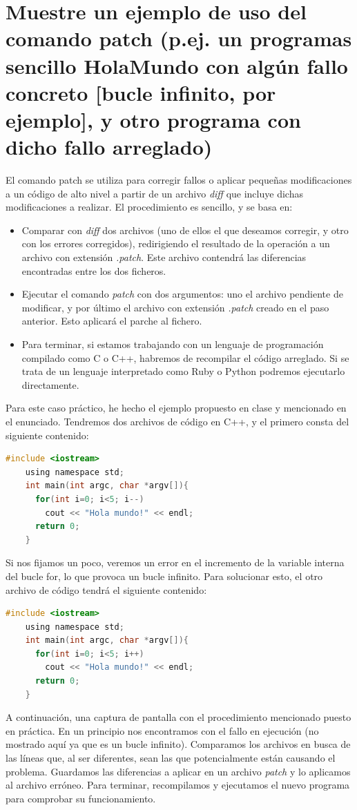 \section{Muestre un ejemplo de uso del comando patch (p.ej. un programas sencillo HolaMundo con algún fallo concreto [bucle infinito, por ejemplo], y otro programa con dicho fallo arreglado)}
El comando patch se utiliza para corregir fallos o aplicar pequeñas modificaciones a un código de alto nivel a partir de un archivo \emph{diff} que incluye dichas modificaciones a realizar. El procedimiento es sencillo, y se basa en:
\begin{itemize}
	\item Comparar con \emph{diff} dos archivos (uno de ellos el que deseamos corregir, y otro con los errores corregidos), redirigiendo el resultado de la operación a un archivo con extensión \emph{.patch}. Este archivo contendrá las diferencias encontradas entre los dos ficheros.
	\item Ejecutar el comando \emph{patch} con dos argumentos: uno el archivo pendiente de modificar, y por último el archivo con extensión \emph{.patch} creado en el paso anterior. Esto aplicará el parche al fichero.
	\item Para terminar, si estamos trabajando con un lenguaje de programación compilado como C o C++, habremos de recompilar el código arreglado. Si se trata de un lenguaje interpretado como Ruby o Python podremos ejecutarlo directamente.
\end{itemize} 
Para este caso práctico, he hecho el ejemplo propuesto en clase y mencionado en el enunciado. Tendremos dos archivos de código en C++, y el primero consta del siguiente contenido:
\begin{lstlisting}[language=c]
	#include <iostream>
	using namespace std;
	int main(int argc, char *argv[]){
	  for(int i=0; i<5; i--)
	    cout << "Hola mundo!" << endl;
	  return 0;
	}
\end{lstlisting}
Si nos fijamos un poco, veremos un error en el incremento de la variable interna del bucle for, lo que provoca un bucle infinito. Para solucionar esto, el otro archivo de código tendrá el siguiente contenido:
\begin{lstlisting}[language=c]
	#include <iostream>
	using namespace std;
	int main(int argc, char *argv[]){
	  for(int i=0; i<5; i++)
	    cout << "Hola mundo!" << endl;
	  return 0;
	}
\end{lstlisting}
A continuación, una captura de pantalla con el procedimiento mencionado puesto en práctica. En un principio nos encontramos con el fallo en ejecución (no mostrado aquí ya que es un bucle infinito). Comparamos los archivos en busca de las líneas que, al ser diferentes, sean las que potencialmente están causando el problema. Guardamos las diferencias a aplicar en un archivo \emph{patch} y lo aplicamos al archivo erróneo. Para terminar, recompilamos y ejecutamos el nuevo programa para comprobar su funcionamiento.
